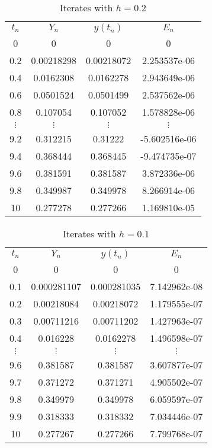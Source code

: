 \documentclass[14pt]{extarticle}
\begin{document}
\begin{table}[htp!]
\caption{Iterates with $h=0.2$}
\centering
\begin{tabular}{cccc}
\\
$t_n$ & $Y_n$ & $y(t_n)$ & $E_n$ \\ [0.5ex]
 0 &          0   &          0 &    0            \\ 
 0.2 & 0.00218298 & 0.00218072 &    2.253537e-06 \\ 
 0.4 &  0.0162308 &  0.0162278 &    2.943649e-06 \\ 
 0.6 &  0.0501524 &  0.0501499 &    2.537562e-06 \\ 
 0.8 &   0.107054 &   0.107052 &    1.578828e-06 \\ 
$\vdots$     & $\vdots$   & $\vdots$ & $\vdots$  \\
 9.2 &   0.312215 &   0.31222  &   -5.602516e-06 \\
 9.4 &   0.368444 &   0.368445 &   -9.474735e-07 \\ 
 9.6 &   0.381591 &   0.381587 &    3.872336e-06 \\ 
 9.8 &   0.349987 &   0.349978 &    8.266914e-06 \\ 
  10 &   0.277278 &   0.277266 &    1.169810e-05 \\ 
\end{tabular}
\label{table:7}
\end{table}

\begin{table}[htp!]
\caption{Iterates with $h=0.1$}
\centering
\begin{tabular}{cccc}
\\
$t_n$ & $Y_n$ & $y(t_n)$ & $E_n$ \\[0.5ex]
 0   &            0 &            0 &    0            \\ 
 0.1 &  0.000281107 &  0.000281035 &    7.142962e-08 \\ 
 0.2 &   0.00218084 &   0.00218072 &    1.179555e-07 \\ 
 0.3 &   0.00711216 &   0.00711202 &    1.427963e-07 \\ 
 0.4 &     0.016228 &    0.0162278 &    1.496598e-07 \\ 
$\vdots$     & $\vdots$   & $\vdots$ & $\vdots$      \\ 
 9.6 &     0.381587 &      0.381587 &   3.607877e-07 \\
 9.7 &     0.371272 &      0.371271 &   4.905502e-07 \\ 
 9.8 &     0.349979 &      0.349978 &   6.059597e-07 \\ 
 9.9 &     0.318333 &      0.318332 &   7.034446e-07 \\ 
  10 &     0.277267 &      0.277266 &   7.799768e-07 \\ 
\end{tabular}
\label{table:8}
\end{table}
\end{document}
